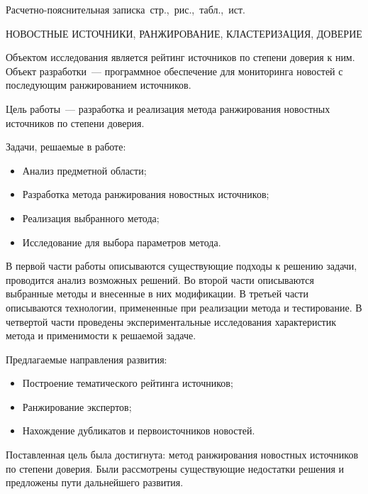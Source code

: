\Referat

Расчетно-пояснительная записка \pageref{LastPage}\,стр., \totfig{}\,рис., \tottab{}\,табл., \,ист.

НОВОСТНЫЕ ИСТОЧНИКИ, РАНЖИРОВАНИЕ, КЛАСТЕРИЗАЦИЯ, ДОВЕРИЕ

Объектом исследования является рейтинг источников по степени доверия к ним. Объект разработки~--- программное обеспечение для мониторинга новостей с последующим ранжированием источников.

Цель работы~--- разработка и реализация метода ранжирования новостных источников по степени доверия.

Задачи, решаемые в работе:
\begin{itemize}
    \item Анализ предметной области;
    \item Разработка метода ранжирования новостных источников;
    \item Реализация выбранного метода;
    \item Исследование для выбора параметров метода.
\end{itemize}

В первой части работы описываются существующие подходы к решению задачи, проводится анализ возможных решений. Во второй части описываются выбранные методы и внесенные в них модификации. В третьей части описываются технологии, примененные при реализации метода и тестирование. В четвертой части проведены экспериментальные исследования характеристик метода и применимости к решаемой задаче.

Предлагаемые направления развития:
\begin{itemize}
    \item Построение тематического рейтинга источников;
    \item Ранжирование экспертов;
    \item Нахождение дубликатов и первоисточников новостей.
\end{itemize}

Поставленная цель была достигнута: метод ранжирования новостных источников по степени доверия. Были рассмотрены существующие недостатки решения и предложены пути
дальнейшего развития.
